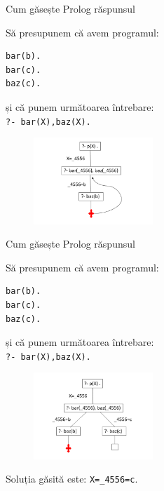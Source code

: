 \documentclass[xcolor=x11names,compress,10pt]{beamer}
\begin{document}
\addtocounter{framenumber}{-1}
\begin{frame}[fragile]{Cum găsește Prolog răspunsul}

\medskip
{}

\medskip
\begin{example}
\begin{multicols}{2}
Să presupunem că avem programul: 
\begin{verbatim}
bar(b). 
bar(c). 
baz(c).
\end{verbatim}
și că punem următoarea întrebare: \\
{\color{blue}\texttt{?- bar(X),baz(X).}}
\columnbreak
\begin{figure}[h]
    \includegraphics[width=0.4\textwidth]{prolog/bar2}
\end{figure}
\end{multicols}
\end{example}
\end{frame}

\addtocounter{framenumber}{-1}
\begin{frame}[fragile]{Cum găsește Prolog răspunsul}

\medskip
{}

\medskip
\begin{example}
\begin{multicols}{2}
Să presupunem că avem programul: 
\begin{verbatim}
bar(b). 
bar(c). 
baz(c).
\end{verbatim}
și că punem următoarea întrebare: \\
{\color{blue}\texttt{?- bar(X),baz(X).}}
\columnbreak
\begin{figure}[h]
    \includegraphics[width=0.4\textwidth]{prolog/bar3}
\end{figure}
\end{multicols}
\end{example}
\medskip

Soluția găsită este: \texttt{X=\_4556=c}.
\end{frame}
\end{document}
